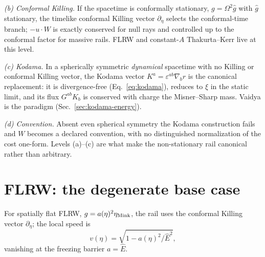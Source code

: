 \documentclass[12pt]{iopart}
\newcommand{\Ehat}{\hat E}
\begin{document}
\emph{(b) Conformal Killing.} If the spacetime is conformally stationary,
$g=\Omega^2\hat g$ with $\hat g$ stationary, the timelike conformal Killing
vector $\partial_\eta$ selects the conformal-time branch; $-u\cdot W$ is exactly
conserved for null rays and controlled up to the conformal factor for massive
rails. FLRW and constant-$A$ Thakurta--Kerr live at this level.

\emph{(c) Kodama.} In a spherically symmetric \emph{dynamical} spacetime with no
Killing or conformal Killing vector, the Kodama vector
$K^a=\varepsilon^{ab}\nabla_b r$ \cite{Kodama1980,Hayward1996} is the canonical
replacement: it is divergence-free (Eq.~\eqref{eq:kodama}), reduces to $\xi$ in
the static limit, and its flux $G^{ab}K_b$ is conserved with charge the
Misner--Sharp mass. Vaidya is the paradigm (Sec.~\ref{sec:kodama-energy}).

\emph{(d) Convention.} Absent even spherical symmetry the Kodama construction
fails and $W$ becomes a declared convention, with no distinguished normalization
of the cost one-form. Levels (a)--(c) are what make the non-stationary rail
canonical rather than arbitrary.


\section{FLRW: the degenerate base case}
\label{sec:flrw}
For spatially flat FLRW, $g=a(\eta)^2\eta_{\rm Mink}$, the rail uses the
conformal Killing vector $\partial_\eta$; the local speed is
\begin{equation}
    v(\eta)=\sqrt{1-a(\eta)^2/\Ehat^{2}},
    \label{eq:flrwspeed}
\end{equation}
vanishing at the freezing barrier $a=\Ehat$.
\end{document}

